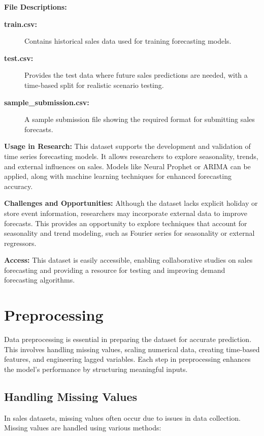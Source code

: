 \textbf{File Descriptions:}
\begin{description}
    \item[\textbf{train.csv:}] Contains historical sales data used for training forecasting models.
    \item[\textbf{test.csv:}] Provides the test data where future sales predictions are needed, with a time-based split for realistic scenario testing.
    \item[\textbf{sample\_submission.csv:}] A sample submission file showing the required format for submitting sales forecasts.
\end{description}

\textbf{Usage in Research:} This dataset supports the development and validation of time series forecasting models. It allows researchers to explore seasonality, trends, and external influences on sales. Models like Neural Prophet or ARIMA can be applied, along with machine learning techniques for enhanced forecasting accuracy.

\textbf{Challenges and Opportunities:} Although the dataset lacks explicit holiday or store event information, researchers may incorporate external data to improve forecasts. This provides an opportunity to explore techniques that account for seasonality and trend modeling, such as Fourier series for seasonality or external regressors.

\textbf{Access:} This dataset is easily accessible, enabling collaborative studies on sales forecasting and providing a resource for testing and improving demand forecasting algorithms.


\section{Preprocessing}

Data preprocessing is essential in preparing the dataset for accurate prediction. This involves handling missing values, scaling numerical data, creating time-based features, and engineering lagged variables. Each step in preprocessing enhances the model's performance by structuring meaningful inputs.

\subsection*{Handling Missing Values}

In sales datasets, missing values often occur due to issues in data collection. Missing values are handled using various methods:

